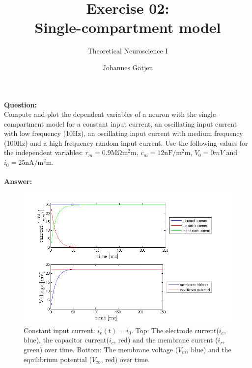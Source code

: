 \documentclass{scrartcl}
\title{Exercise 02:\\Single-compartment model}
\subtitle{Theoretical Neuroscience I}
\author{Johannes G\"atjen}
\newcommand\Question{%
  \textbf{Question:}%
}
\newcommand\Answer{%
  \textbf{Answer:}%
}
\begin{document}
\maketitle
\Question\\
Compute and plot the dependent variables of a neuron with the single-compartment model for a constant input current, an oscillating input current with low frequency (10\si{Hz}), an oscillating input current with medium frequency (100\si{Hz}) and a high frequency random input current. Use the following values for the independent variables: $r_m = 0.9\si{\mega\ohm\square\milli\meter}$, $c_m = 12\si{\nano\farad\per\square\milli\meter}$, $V_0 = 0\si{mV}$ and $i_0 = 25 \si{\nano\ampere\per\square\milli\meter}$.
\\\\
\Answer\\
\begin{figure}[h]
\centering
\includegraphics[trim = {1.3cm 0 2cm 0.9cm}, width=\textwidth, clip]{../pics/constant}
\caption{\small{Constant input current: $i_e(t) = i_0$. Top: The electrode current($i_e$, blue), the capacitor current($i_c$, red) and the membrane current ($i_r$, green) over time. Bottom: The membrane voltage ($V_m$, blue) and the equilibrium potential ($V_\infty$, red) over time.}}
\label{constant}
\end{figure}
\end{document}
